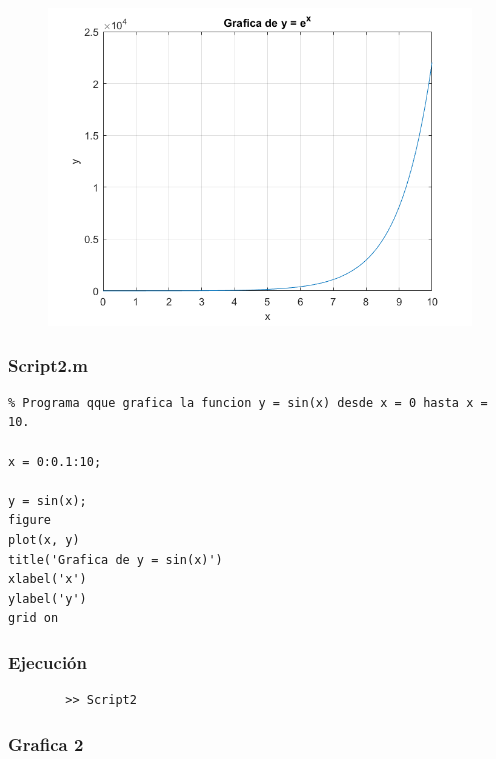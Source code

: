 \documentclass{article}
\begin{document}
	\begin{figure}[h]
	\centering
	\includegraphics[width=\textwidth]{grafica1.png}
	\end{figure}
	
	\subsubsection{Script2.m}
	
	\begin{lstlisting}
% Programa qque grafica la funcion y = sin(x) desde x = 0 hasta x = 10.

x = 0:0.1:10;

y = sin(x);
figure
plot(x, y)
title('Grafica de y = sin(x)')
xlabel('x')
ylabel('y')
grid on
	\end{lstlisting}
	
	\subsubsection{Ejecución}
	
	\begin{lstlisting}
		>> Script2
	\end{lstlisting}
	
	\subsubsection{Grafica 2}
	
\end{document}
